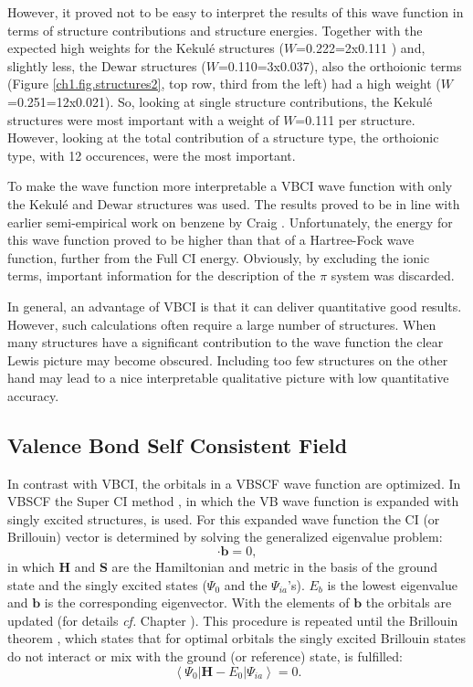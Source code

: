 However, it proved not to be easy to interpret the results of this wave function in terms of structure contributions and structure energies. Together with the expected high weights for the Kekul\'{e} structures ($W$=0.222=2x0.111 \cite{vbci175_2}) and, slightly less, the Dewar structures ($W$=0.110=3x0.037), also the orthoionic terms (Figure \ref{ch1.fig.structures2}, top row, third from the left) had a high weight ($W$=0.251=12x0.021). So, looking at single structure contributions, the Kekul\'e structures were most important with a weight of $W$=0.111 per structure. However, looking at the total contribution of a structure type, the orthoionic type, with 12 occurences, were the most important.

To make the wave function more interpretable a VBCI wave function with only the Kekul\'{e} and Dewar structures was used. The results proved to be in line with earlier semi-empirical work on benzene by Craig \cite{craig}. Unfortunately, the energy for this wave function proved to be higher than that of a Hartree-Fock wave function, further from the Full CI energy. Obviously, by excluding the ionic terms, important information for the description of the $\pi$ system was discarded.

In general, an advantage of VBCI is that it can deliver quantitative good results. However, such calculations often require a large number of structures. When many structures have a significant contribution to the wave function the clear Lewis picture may become obscured. Including too few structures on the other hand may lead to a nice interpretable qualitative picture with low quantitative accuracy. 

\subsection{Valence Bond Self Consistent Field}

In contrast with VBCI, the orbitals in a VBSCF wave function are optimized. In VBSCF the Super CI method \cite{superci1,superci2}, in which the VB wave function is expanded with singly excited structures, is used. For this expanded wave function the CI (or Brillouin) vector is determined by solving the generalized eigenvalue problem:
\begin{equation}
[\mathbf{H}-E_b\mathbf{S}] \cdot \mathbf{b} = 0,
\label{ch1.eq.geig}
\end{equation}
in which $\mathbf{H}$ and $\mathbf{S}$ are the Hamiltonian and metric in the basis of the ground state and the singly excited states ($\Psi_0$ and the $\Psi_{ia}$'s). $E_b$ is the lowest eigenvalue and $\mathbf{b}$ is the corresponding eigenvector. With the elements of $\mathbf{b}$ the orbitals are updated (for details  \textit{cf.} Chapter \chorbopt). This procedure is repeated until the Brillouin theorem \cite{brillouin}, which states that for optimal orbitals the singly excited Brillouin states do not interact or mix with the ground (or reference) state, is fulfilled:
\begin{equation}
\left < \Psi_0 | \mathbf{H} - E_0 | \Psi_{ia} \right > = 0.
\label{ch1.eq.brillouin}
\end{equation}


